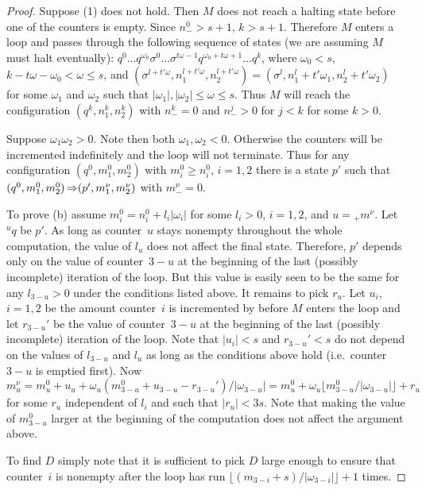 \documentclass[12pt]{article}
\begin{document}
\begin{proof}
Suppose (1) does not hold. Then $M$ does not reach a halting state
before one of the counters is empty. Since $n^0_->s+1$, $k>s+1$. 
Therefore $M$ enters
a loop and passes through the following sequence of states (we are
assuming $M$ must halt eventually):
$q^0\ldots q^{\omega_0}\sigma^0\ldots\sigma^{t\omega-1}q^{\omega_0+t\omega+1}\ldots
q^k$,
where $\omega_0<s$, $k-t\omega-\omega_0<\omega\leq s$, and $(\sigma^{l+t'\omega},
n^{l+t'\omega}_1,
n^{l+t'\omega}_2)=(\sigma^l,n^l_1+t'\omega_1,n^l_2+t'\omega_2)$ for some $\omega_1$ and
$\omega_2$ such that $|\omega_1|,|\omega_2|\leq\omega\leq s$. 
Thus $M$ will reach the configuration $(q^k, n^k_1, n^k_2)$ with $n^k_-=0$
and $n_-^j>0$ for $j<k$ for some $k>0$.
 
Suppose $\omega_1\omega_2>0$. Note then both
$\omega_1,\omega_2<0$. Otherwise the counters will be incremented
indefinitely and the loop will not terminate. Thus for any configuration $(q^0, m^0_1,
m^0_2)$ with $m^0_i\geq n^0_i$, $i=1,2$ there is a state $p'$ such
that $(q^0, m^0_1,m^0_2)\mathop{\Rightarrow}\limits^{}(p',m^\nu_1,m^\nu_2)$ with $m^\nu_-=0$. 

To prove (b) assume $m^0_i=n^0_i+l_i|\omega_i|$ for some $l_i>0$, $i=1,2$, and
$u={}_+m^\nu$. Let ${}^uq$ be $p'$. As long as counter~$u$
stays nonempty throughout the whole computation, the value of $l_u$ does not affect
the final state. Therefore, $p'$ depends only on the value of
counter~$3-u$ at the beginning of the last (possibly incomplete) iteration of the loop.
But this value is easily seen to be the same for any $l_{3-u}>0$ under the
conditions listed above. It remains to pick $r_u$. Let $u_i$, $i=1,2$ be the
amount counter~$i$ is incremented by before $M$ enters the loop and let
$r_{3-u}'$ be the value of counter~$3-u$ at the beginning of the last
(possibly incomplete) iteration of the loop. Note that $|u_i|<s$ and $r_{3-u}'<s$
do not depend on the values of $l_{3-u}$ and $l_u$ as long as the
conditions above hold (i.e.\ counter~$3-u$ is emptied first). Now
$m^\nu_u=m^0_u+u_u+\omega_u(m^0_{3-u}+u_{3-u}-r_{3-u}')/|\omega_{3-u}|=m^0_u+\omega_u\lfloor
m^0_{3-u}/|\omega_{3-u}|\rfloor+r_u$ for some $r_u$ independent of $l_i$ and
such that $|r_u|<3s$. Note that making the value of $m^0_{3-u}$ larger at
the beginning of the computation does not affect the argument above.

To find $D$ simply note that it is sufficient to pick $D$ large enough
to ensure that counter~$i$ is nonempty after the loop has run $\lfloor
(m_{3-i}+s)/|\omega_{3-i}|\rfloor+1$ times.


\end{proof}
\end{document}
